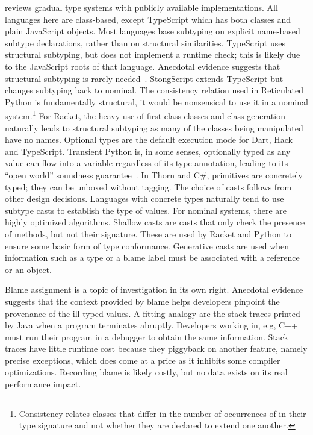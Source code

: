 \documentclass[acmlarge, anonymous, authordraft, review]{acmart} %
\begin{document}
 reviews gradual type systems with publicly available
implementations. All languages here are class-based, except TypeScript which
has both classes and plain JavaScript objects. Most languages base subtyping
on explicit name-based subtype declarations, rather than on structural
similarities.  TypeScript uses structural subtyping, but does not implement
a runtime check; this is likely due to the JavaScript roots of that
language.  Anecdotal evidence suggests that structural subtyping is rarely
needed~\cite{ecoop15}. StongScript extends TypeScript but changes subtyping
back to nominal.  The consistency relation used in Reticulated Python is
fundamentally structural, it would be nonsensical to use it in a nominal
system.\footnote{Consistency relates classes that differ in the number of
  occurrences of \any in their type signature and not whether they are
  declared to extend one another.}  For Racket, the heavy use of first-class
classes and class generation naturally leads to structural subtyping as many
of the classes being manipulated have no names.  Optional types are the
default execution mode for Dart, Hack and TypeScript.  Transient Python is,
in some senses, optionally typed as any value can flow into a variable
regardless of its type annotation, leading to its ``open world'' soundness
guarantee~\cite{siek14}.  In Thorn and C\#, primitives are concretely typed;
they can be unboxed without tagging.  The choice of casts follows from other
design decisions. Languages with concrete types naturally tend to use
subtype casts to establish the type of values. For nominal systems, there are
highly optimized algorithms. Shallow casts are casts that only check the
presence of methods, but not their signature. These are used by Racket and
Python to ensure some basic form of type conformance. Generative casts are
used when information such as a type or a blame label must be associated
with a reference or an object.

Blame assignment is a topic of investigation in its own right. Anecdotal
evidence suggests that the context provided by blame helps developers
pinpoint the provenance of the ill-typed values. A fitting analogy are the
stack traces printed by Java when a program terminates abruptly. Developers
working in, e.g, C++ must run their program in a debugger to obtain the same
information. Stack traces have little runtime cost because they piggyback
on another feature, namely precise exceptions, which does come at a price as
it inhibits some compiler optimizations. Recording blame is likely costly, 
but no data exists on its real performance impact.
\end{document}
